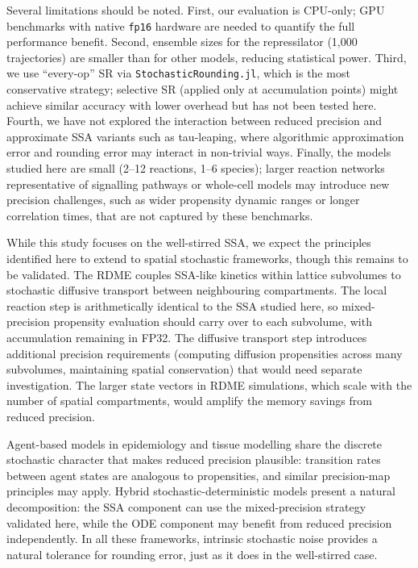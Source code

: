 \documentclass{article}
\begin{document}
Several limitations should be noted. First, our evaluation is CPU-only; GPU benchmarks with native \texttt{fp16} hardware are needed to quantify the full performance benefit. Second, ensemble sizes for the repressilator (1,000 trajectories) are smaller than for other models, reducing statistical power. Third, we use ``every-op'' SR via \texttt{StochasticRounding.jl}, which is the most conservative strategy; selective SR (applied only at accumulation points) might achieve similar accuracy with lower overhead but has not been tested here. Fourth, we have not explored the interaction between reduced precision and approximate SSA variants such as tau-leaping, where algorithmic approximation error and rounding error may interact in non-trivial ways. Finally, the models studied here are small (2--12 reactions, 1--6 species); larger reaction networks representative of signalling pathways or whole-cell models may introduce new precision challenges, such as wider propensity dynamic ranges or longer correlation times, that are not captured by these benchmarks.

While this study focuses on the well-stirred SSA, we expect the principles identified here to extend to spatial stochastic frameworks, though this remains to be validated. The RDME \cite{engblom2009} couples SSA-like kinetics within lattice subvolumes to stochastic diffusive transport between neighbouring compartments. The local reaction step is arithmetically identical to the SSA studied here, so mixed-precision propensity evaluation should carry over to each subvolume, with accumulation remaining in FP32. The diffusive transport step introduces additional precision requirements (computing diffusion propensities across many subvolumes, maintaining spatial conservation) that would need separate investigation. The larger state vectors in RDME simulations, which scale with the number of spatial compartments, would amplify the memory savings from reduced precision.

Agent-based models in epidemiology and tissue modelling \cite{an2009} share the discrete stochastic character that makes reduced precision plausible: transition rates between agent states are analogous to propensities, and similar precision-map principles may apply. Hybrid stochastic-deterministic models present a natural decomposition: the SSA component can use the mixed-precision strategy validated here, while the ODE component may benefit from reduced precision independently. In all these frameworks, intrinsic stochastic noise provides a natural tolerance for rounding error, just as it does in the well-stirred case.
\end{document}

